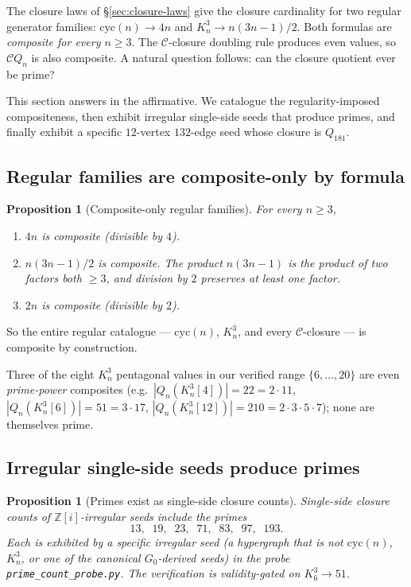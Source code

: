 \documentclass[12pt,a4paper]{article}
\newtheorem{proposition}[theorem]{Proposition}
\theoremstyle{definition}
\theoremstyle{remark}
\newcommand{\bZi}{\mathbb{Z}[i]}            %
\newcommand{\Kn}{K_n^3}
\newcommand{\Qn}{Q_n}
\newcommand{\Ccls}{\mathcal{C}}             %
\newcommand{\cyc}{\mathrm{cyc}}
\begin{document}
The closure laws of \S\ref{sec:closure-laws} give the closure cardinality
for two regular generator families: $\cyc(n) \to 4n$ and $\Kn \to
n(3n{-}1)/2$. Both formulas are \emph{composite for every $n \ge 3$}.
The $\Ccls$-closure doubling rule produces even values, so $\Ccls\Qn$
is also composite. A natural question follows: can the closure
quotient ever be prime?

This section answers in the affirmative. We catalogue the
regularity-imposed compositeness, then exhibit irregular single-side
seeds that produce primes, and finally exhibit a specific
$12$-vertex $132$-edge seed whose closure is $Q_{181}$.

\subsection{Regular families are composite-only by formula}
\label{sec:primes-composite}

\begin{proposition}[Composite-only regular families]
\label{prop:composite-regular}
For every $n \ge 3$,
\begin{enumerate}[leftmargin=2em,topsep=2pt,itemsep=2pt]
\item $4n$ is composite (divisible by $4$).
\item $n(3n{-}1)/2$ is composite. The product $n(3n{-}1)$ is the
product of two factors both $\ge 3$, and division by $2$ preserves at
least one factor.
\item $2n$ is composite (divisible by $2$).
\end{enumerate}
\end{proposition}

So the entire regular catalogue --- $\cyc(n)$, $\Kn$, and every
$\Ccls$-closure --- is composite by construction.

Three of the eight $\Kn$ pentagonal values in our verified range
$\{6, \dots, 20\}$ are even \emph{prime-power} composites
(e.g.\ $|\Qn(\Kn[4])| = 22 = 2 \cdot 11$, $|\Qn(\Kn[6])| = 51 = 3
\cdot 17$, $|\Qn(\Kn[12])| = 210 = 2 \cdot 3 \cdot 5 \cdot 7$); none
are themselves prime.

\subsection{Irregular single-side seeds produce primes}
\label{sec:primes-irregular}

\begin{proposition}[Primes exist as single-side closure counts]
\label{prop:primes-exist}
Single-side closure counts of $\bZi$-irregular seeds include the primes
\[
13, \;\; 19, \;\; 23, \;\; 71, \;\; 83, \;\; 97, \;\; 193.
\]
Each is exhibited by a specific irregular seed (a hypergraph that is
not $\cyc(n)$, $\Kn$, or one of the canonical $G_0$-derived seeds)
in the probe \texttt{prime\_count\_probe.py}. The verification is
validity-gated on $K_6^3 \to 51$.
\end{proposition}
\end{document}
